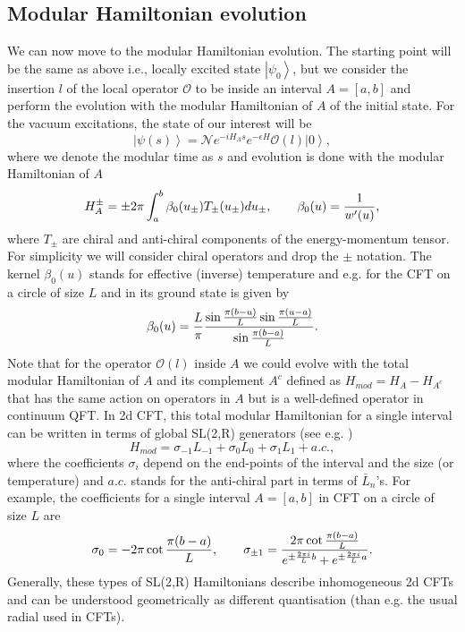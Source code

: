 \documentclass[aps,prl,twocolumn,showpacs,preprintnumbers,amsmath,amssymb]{revtex4-1}
\def\frac#1#2{{#1\over #2}}
\def\be{\begin{equation}}
\def\ee{\end{equation}}
\newcommand{\ket}[1]{\left| #1 \right>}
\begin{document}
\subsection{Modular Hamiltonian evolution}
We can now move to the modular Hamiltonian evolution. The starting point will be the same as above i.e., locally excited state $\ket{\psi_0}$, but we consider the insertion $l$ of the local operator $\mathcal{O}$ to be inside an interval $A=[a,b]$ and perform the evolution with the modular Hamiltonian of $A$ of the initial state. For the vacuum excitations, the state of our interest will be
\be
\ket{\psi(s)}=\mathcal{N}e^{-iH_A s}e^{-\epsilon H}\mathcal{O}(l)\ket{0},
\ee
where we denote the modular time as $s$ and evolution is done with the modular Hamiltonian of $A$ 
\be
H^\pm_A=\pm 2\pi\int^b_a\beta_0(u_\pm)T_\pm(u_\pm)du_\pm,\qquad \beta_0(u)=\frac{1}{w'(u)},\label{ModHam1}
\ee
where $T_\pm$ are chiral and anti-chiral components of the energy-momentum tensor. For simplicity we will consider chiral operators and drop the $\pm$ notation. The kernel $\beta_0(u)$ stands for effective (inverse) temperature and e.g. for the CFT on a circle of size $L$  and in its ground state is given by
\be
\beta_0(u)=\frac{L}{\pi}\frac{\sin\frac{\pi(b-u)}{L}\sin\frac{\pi(u-a)}{L}}{\sin\frac{\pi(b-a)}{L}}.\label{BetaFSIZE}
\ee
Note that for the operator $\mathcal{O}(l)$ inside $A$ we could evolve with the total modular Hamiltonian of $A$ and its complement $A^c$ defined as $H_{mod}=H_A-H_{A^c}$ that has the same action on operators in $A$ but is a well-defined operator in continuum QFT. In 2d CFT, this total modular Hamiltonian for a single interval can be written in terms of global SL(2,R) generators (see e.g. \cite{Kabat:2017mun,Czech:2019vih})
\be
H_{mod}=\sigma_{-1}L_{-1}+\sigma_0L_0+\sigma_1L_1+a.c.,\label{TotModHam}
\ee
where the coefficients $\sigma_i$ depend on the end-points of the interval and the size (or temperature) and $a.c.$ stands for the anti-chiral part in terms of $\bar{L}_n$'s.  For example, the coefficients for a single interval $A=[a,b]$ in CFT on a circle of size $L$ are
\be
\sigma_0=-2\pi\cot\frac{\pi(b-a)}{L},\qquad \sigma_{\pm1}=\frac{2\pi\cot\frac{\pi(b-a)}{L}}{e^{\pm\frac{2\pi i }{L}b}+e^{\pm\frac{2\pi i }{L}a}}.
\ee
Generally, these types of SL(2,R) Hamiltonians describe inhomogeneous 2d CFTs and can be understood geometrically as different quantisation (than e.g. the usual radial used in CFTs).
\end{document}
